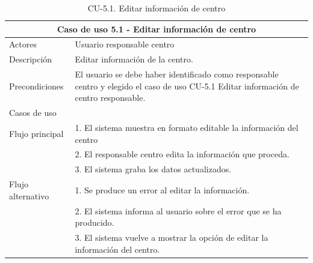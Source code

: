 \begin{table}[H]
    \caption{CU-5.1. Editar información de centro}
    \label{tab:CU-5.1}
    \begin{center}
        \begin{tabular}{|l|p{12cm}|}
            \hline
            \multicolumn{2}{|c|}{Caso de uso 5.1 - Editar información de centro} \\ \hline \hline
            Actores                 &   Usuario responsable centro          \\  \hline
            Descripción             &   Editar información  de la centro. \\  \hline
            Precondiciones          &   El usuario se debe haber identificado como responsable centro y elegido el caso de uso CU-5.1 Editar información de centro responsable. \\
            \hline
            Casos de uso            &             \\  \hline
            Flujo principal         &   1. El sistema muestra en formato editable la información del centro   \\
            &   2. El responsable centro edita la información que proceda.    \\ 
            & 3. El sistema graba los datos actualizados. \\ 
            \hline
            Flujo alternativo    &   1. Se produce un error al editar la información. \\
            & 2. El sistema informa al usuario sobre el error que se ha producido. \\
            & 3. El sistema vuelve a mostrar la opción de editar la información del centro. \\ 
            \hline
        \end{tabular}
    \end{center}
\end{table}

